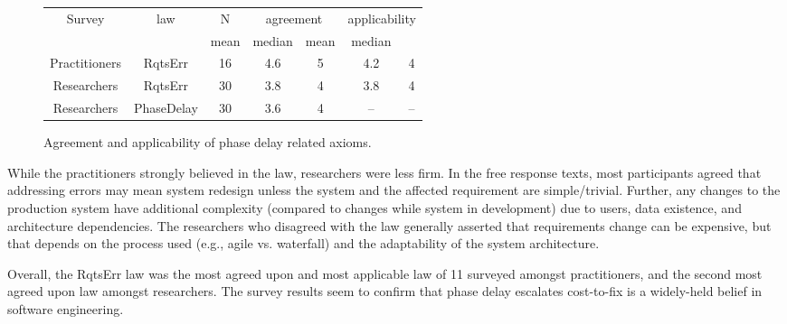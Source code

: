 \begin{figure}[!h]
\renewcommand{\baselinestretch}{0.7}
\scriptsize
\begin{center}
\begin{tabular}{c|c|c|c|c|c|c}
Survey & law & N & \multicolumn{2}{c}{agreement} & \multicolumn{2}{c}{applicability} \\ 
 & & mean & median & mean & median \\
\hline 
Practitioners & RqtsErr & 16 & 4.6 & 5 & 4.2 & 4 \\ 
Researchers & RqtsErr & 30 & 3.8 & 4 & 3.8 & 4 \\ 
Researchers & PhaseDelay & 30 & 3.6 & 4 & -- & -- 
\end{tabular} 
\end{center}
\caption{Agreement and applicability of phase delay related axioms.}
\label{fig:survey_results}
\end{figure}

While the practitioners strongly believed in the law, researchers were less firm. In the free response texts, most participants agreed that addressing errors may mean system redesign unless the system and the affected requirement are simple/trivial. Further, any changes to the production system have additional complexity (compared to changes while system in development) due to users, data existence, and architecture dependencies. The researchers who disagreed with the law generally asserted that requirements change can be expensive, but that depends on the process used (e.g., agile vs. waterfall) and the adaptability of the system architecture.

Overall, the RqtsErr law was the most agreed upon and most applicable law of 11 surveyed amongst practitioners, and the second most agreed upon law amongst researchers. The survey results seem to confirm that phase delay escalates cost-to-fix is a widely-held belief in software engineering.